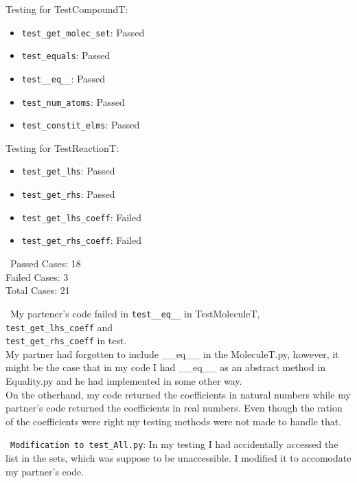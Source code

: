 \documentclass[12pt]{article}
\begin{document}
Testing for TestCompoundT:
\begin{itemize}
\item \texttt{test\_get\_molec\_set}: Passed
\item \texttt{test\_equals}: Passed
\item \texttt{test\_\_eq\_\_}: Passed 
\item \texttt{test\_num\_atoms}: Passed
\item \texttt{test\_constit\_elms}: Passed\\
\end{itemize}

Testing for TestReactionT:
\begin{itemize}
\item \texttt{test\_get\_lhs}: Passed
\item \texttt{test\_get\_rhs}: Passed
\item \texttt{test\_get\_lhs\_coeff}: Failed
\item \texttt{test\_get\_rhs\_coeff}: Failed
\end{itemize}

~\newline\noindent Passed Cases: 18\\
Failed Cases: 3\\
Total Cases: 21

~\newline\noindent  My partener's code failed in \texttt{test\_\_eq\_\_} in TestMoleculeT, \texttt{test\_get\_lhs\_coeff} and\\ \texttt{test\_get\_rhs\_coeff} in test.\\

My partner had forgotten to include \_\_eq\_\_ in the MoleculeT.py, however, it might be the case that in my code I had \_\_eq\_\_ as an abstract method in Equality.py and he had implemented in some other way.\\

On the otherhand, my code returned the coefficients in natural numbers while my partner's code returned the coefficients in real numbers. Even though the ration of the coefficients were right my testing methods were not made to handle that.

~\newline\noindent \texttt{Modification to test\_All.py}: In my testing I had accidentally accessed the list in the sets, which was suppose to be unaccessible. I modified it to accomodate my partner's code.

\newpage
\end{document}
